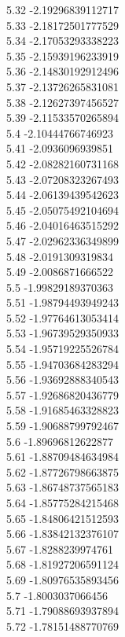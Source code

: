 {5.32	-2.19296839112717\\
5.33	-2.18172501777529\\
5.34	-2.17053293338223\\
5.35	-2.15939196233919\\
5.36	-2.14830192912496\\
5.37	-2.13726265831081\\
5.38	-2.12627397456527\\
5.39	-2.11533570265894\\
5.4	-2.10444766746923\\
5.41	-2.0936096939851\\
5.42	-2.08282160731168\\
5.43	-2.07208323267493\\
5.44	-2.06139439542623\\
5.45	-2.05075492104694\\
5.46	-2.04016463515292\\
5.47	-2.02962336349899\\
5.48	-2.0191309319834\\
5.49	-2.0086871666522\\
5.5	-1.99829189370363\\
5.51	-1.98794493949243\\
5.52	-1.97764613053414\\
5.53	-1.96739529350933\\
5.54	-1.95719225526784\\
5.55	-1.94703684283294\\
5.56	-1.93692888340543\\
5.57	-1.92686820436779\\
5.58	-1.91685463328823\\
5.59	-1.90688799792467\\
5.6	-1.89696812622877\\
5.61	-1.88709484634984\\
5.62	-1.87726798663875\\
5.63	-1.86748737565183\\
5.64	-1.85775284215468\\
5.65	-1.84806421512593\\
5.66	-1.83842132376107\\
5.67	-1.8288239974761\\
5.68	-1.81927206591124\\
5.69	-1.80976535893456\\
5.7	-1.8003037066456\\
5.71	-1.79088693937894\\
5.72	-1.78151488770769\\
}

